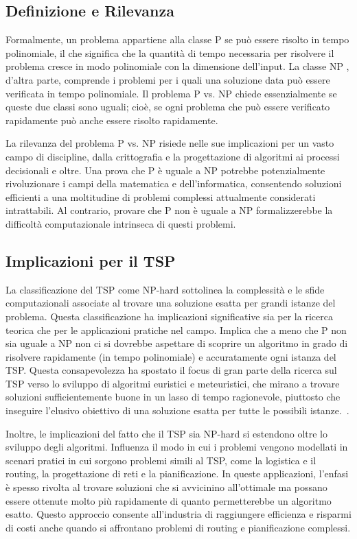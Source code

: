 \subsection{Definizione e Rilevanza}

Formalmente, un problema appartiene alla classe \Gls{P} se può essere risolto in tempo polinomiale, il che significa che la quantità di tempo necessaria per risolvere il problema cresce in modo polinomiale con la dimensione dell'input. La classe \Gls{NP} , d'altra parte, comprende i problemi per i quali una soluzione data può essere verificata in tempo polinomiale. Il problema \Gls{P} vs. \Gls{NP} chiede essenzialmente se queste due classi sono uguali; cioè, se ogni problema che può essere verificato rapidamente può anche essere risolto rapidamente.

La rilevanza del problema \Gls{P} vs. \Gls{NP} risiede nelle sue implicazioni per un vasto campo di discipline, dalla crittografia e la progettazione di algoritmi ai processi decisionali e oltre. Una prova che \Gls{P} è uguale a \Gls{NP} potrebbe potenzialmente rivoluzionare i campi della matematica e dell'informatica, consentendo soluzioni efficienti a una moltitudine di problemi complessi attualmente considerati intrattabili. Al contrario, provare che \Gls{P} non è uguale a \Gls{NP} formalizzerebbe la difficoltà computazionale intrinseca di questi problemi.

\subsection{Implicazioni per il \Gls{TSP}}

La classificazione del \Gls{TSP} come \Gls{NP}-hard sottolinea la complessità e le sfide computazionali associate al trovare una soluzione esatta per grandi istanze del problema. Questa classificazione ha implicazioni significative sia per la ricerca teorica che per le applicazioni pratiche nel campo. Implica che a meno che \Gls{P} non sia uguale a \Gls{NP} non ci si dovrebbe aspettare di scoprire un algoritmo in grado di risolvere rapidamente (in tempo polinomiale) e accuratamente ogni istanza del \Gls{TSP}. Questa consapevolezza ha spostato il focus di gran parte della ricerca sul \Gls{TSP} verso lo sviluppo di algoritmi euristici e meteuristici, che mirano a trovare soluzioni sufficientemente buone in un lasso di tempo ragionevole, piuttosto che inseguire l'elusivo obiettivo di una soluzione esatta per tutte le possibili istanze.~\cite{Karp1972}.

Inoltre, le implicazioni del fatto che il \Gls{TSP} sia \Gls{NP}-hard si estendono oltre lo sviluppo degli algoritmi. Influenza il modo in cui i problemi vengono modellati in scenari pratici in cui sorgono problemi simili al \Gls{TSP}, come la logistica e il routing, la progettazione di reti e la pianificazione. In queste applicazioni, l'enfasi è spesso rivolta al trovare soluzioni che si avvicinino all'ottimale ma possano essere ottenute molto più rapidamente di quanto permetterebbe un algoritmo esatto. Questo approccio consente all'industria di raggiungere efficienza e risparmi di costi anche quando si affrontano problemi di routing e pianificazione complessi.

